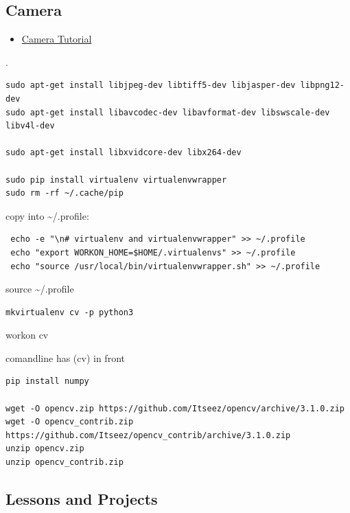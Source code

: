 \subsection{Camera}\label{camera}

\begin{itemize}
\tightlist
\item
  \href{https://www.raspberrypi.org/learning/getting-started-with-picamera/worksheet/}{Camera
  Tutorial}
\end{itemize}

.

\begin{verbatim}
sudo apt-get install libjpeg-dev libtiff5-dev libjasper-dev libpng12-dev
sudo apt-get install libavcodec-dev libavformat-dev libswscale-dev libv4l-dev

sudo apt-get install libxvidcore-dev libx264-dev

sudo pip install virtualenv virtualenvwrapper
sudo rm -rf ~/.cache/pip
\end{verbatim}

copy into \textasciitilde{}/.profile:

\begin{verbatim}
 echo -e "\n# virtualenv and virtualenvwrapper" >> ~/.profile
 echo "export WORKON_HOME=$HOME/.virtualenvs" >> ~/.profile
 echo "source /usr/local/bin/virtualenvwrapper.sh" >> ~/.profile
\end{verbatim}

source \textasciitilde{}/.profile

\begin{verbatim}
mkvirtualenv cv -p python3
\end{verbatim}

workon cv

comandline has (cv) in front

\begin{verbatim}
pip install numpy

wget -O opencv.zip https://github.com/Itseez/opencv/archive/3.1.0.zip
wget -O opencv_contrib.zip https://github.com/Itseez/opencv_contrib/archive/3.1.0.zip
unzip opencv.zip
unzip opencv_contrib.zip
\end{verbatim}

\subsection{Lessons and Projects}\label{lessons-and-projects}

